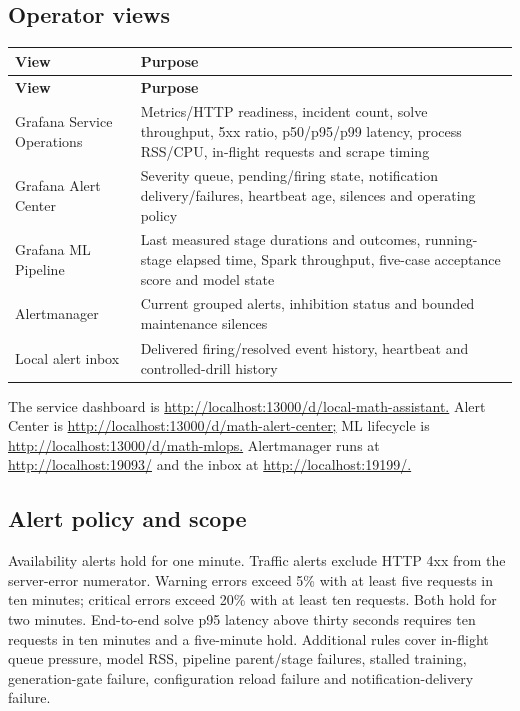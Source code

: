 \documentclass[11pt,a4paper]{article}
\begin{document}
\subsection*{Operator views}
\begingroup\small
\begin{longtable}{@{}>{\raggedright\arraybackslash}p{0.5000\dimexpr\textwidth-12pt\relax}>{\raggedright\arraybackslash}p{0.5000\dimexpr\textwidth-12pt\relax}@{}}
\toprule
\textbf{View} & \textbf{Purpose} \\
\midrule
\endfirsthead
\textbf{View} & \textbf{Purpose} \\
\midrule
\endhead
Grafana Service Operations & Metrics/HTTP readiness, incident count, solve throughput, 5xx ratio, p50/p95/p99 latency, process RSS/CPU, in-flight requests and scrape timing \\
Grafana Alert Center & Severity queue, pending/firing state, notification delivery/failures, heartbeat age, silences and operating policy \\
Grafana ML Pipeline & Last measured stage durations and outcomes, running-stage elapsed time, Spark throughput, five-case acceptance score and model state \\
Alertmanager & Current grouped alerts, inhibition status and bounded maintenance silences \\
Local alert inbox & Delivered firing/resolved event history, heartbeat and controlled-drill history \\
\bottomrule
\end{longtable}
\endgroup
The service dashboard is \url{http://localhost:13000/d/local-math-assistant.} Alert Center is \url{http://localhost:13000/d/math-alert-center;} ML lifecycle is \url{http://localhost:13000/d/math-mlops.} Alertmanager runs at \url{http://localhost:19093/} and the inbox at \url{http://localhost:19199/.}

\subsection*{Alert policy and scope}
Availability alerts hold for one minute. Traffic alerts exclude HTTP 4xx from the server-error numerator. Warning errors exceed 5\% with at least five requests in ten minutes; critical errors exceed 20\% with at least ten requests. Both hold for two minutes. End-to-end solve p95 latency above thirty seconds requires ten requests in ten minutes and a five-minute hold. Additional rules cover in-flight queue pressure, model RSS, pipeline parent/stage failures, stalled training, generation-gate failure, configuration reload failure and notification-delivery failure.
\end{document}
